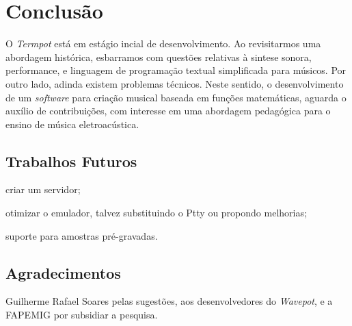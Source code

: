\section{Conclusão}\label{sec:conclusao}

O \emph{Termpot} está em estágio incial de desenvolvimento. Ao revisitarmos uma abordagem histórica, esbarramos com questões relativas à sintese sonora, performance, e linguagem de programação textual simplificada para músicos. Por outro lado, adinda existem problemas técnicos. Neste sentido, o desenvolvimento de um \emph{software} para criação musical baseada em funções matemáticas, aguarda o auxílio de contribuições, com interesse em uma abordagem pedagógica para o ensino de música eletroacústica.

\subsection{Trabalhos Futuros}

\begin{inparaenum}
\item criar um servidor;
\item otimizar o emulador, talvez substituindo o Ptty ou propondo melhorias;
\item suporte para amostras pré-gravadas.
\end{inparaenum}
\subsection{Agradecimentos}

Guilherme Rafael Soares pelas sugestões, aos desenvolvedores do \emph{Wavepot}, e a FAPEMIG por subsidiar a pesquisa.
